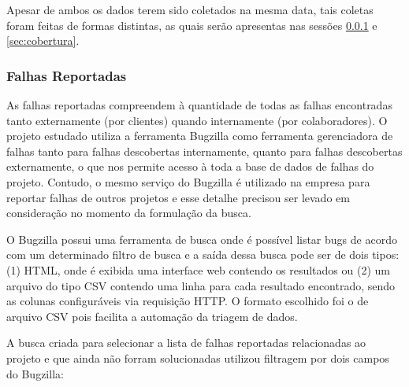 \documentclass[11.5pt]{article}
\begin{document}
Apesar de ambos os dados terem sido coletados na mesma data, tais coletas foram feitas de formas
distintas, as quais serão apresentas nas sessões \ref{sec:falhasReportadas} e \ref{sec:cobertura}.

\subsubsection{Falhas Reportadas} \label{sec:falhasReportadas}

As falhas reportadas compreendem à quantidade de todas as falhas encontradas tanto externamente
(por clientes) quando internamente (por colaboradores).
O projeto estudado utiliza a ferramenta Bugzilla como ferramenta gerenciadora de falhas tanto para
falhas descobertas internamente, quanto para falhas descobertas externamente, o que nos permite
acesso à toda a base de dados de falhas do projeto.
Contudo, o mesmo serviço do Bugzilla é utilizado na empresa para reportar falhas de outros projetos
e esse detalhe precisou ser levado em consideração no momento da formulação da busca.

O Bugzilla possui uma ferramenta de busca onde é possível listar bugs de acordo com um determinado
filtro de busca e a saída dessa busca pode ser de dois tipos: (1) HTML, onde é exibida uma interface
web contendo os resultados ou
(2) um arquivo do tipo CSV contendo uma linha para cada resultado encontrado, sendo as colunas
configuráveis via requisição HTTP.
O formato escolhido foi o de arquivo CSV pois facilita a automação da triagem de dados.

A busca criada para selecionar a lista de falhas reportadas relacionadas ao projeto e que ainda não
forram solucionadas utilizou filtragem por dois campos do Bugzilla:
\end{document}
